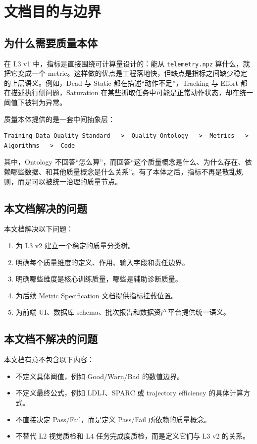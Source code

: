 \documentclass[UTF8,zihao=-4,oneside,openany]{ctexrep}
\newcommand{\Code}[1]{\texttt{#1}}
\begin{document}
\section{文档目的与边界}

\subsection{为什么需要质量本体}

在 L3 v1 中，指标是直接围绕可计算量设计的：能从 \Code{telemetry.npz} 算什么，就把它变成一个 metric。这样做的优点是工程落地快，但缺点是指标之间缺少稳定的上层语义。例如，Dead 与 Static 都在描述“动作不足”，Tracking 与 Effort 都在描述执行侧问题，Saturation 在某些抓取任务中可能是正常动作状态，却在统一阈值下被判为异常。

质量本体提供的是一套中间抽象层：
\begin{verbatim}
Training Data Quality Standard  ->  Quality Ontology  ->  Metrics  ->  Algorithms  ->  Code
\end{verbatim}

其中，Ontology 不回答“怎么算”，而回答“这个质量概念是什么、为什么存在、依赖哪些数据、和其他质量概念是什么关系”。有了本体之后，指标不再是散乱规则，而是可以被统一治理的质量节点。

\subsection{本文档解决的问题}

本文档解决以下问题：
\begin{enumerate}
  \item 为 L3 v2 建立一个稳定的质量分类树。
  \item 明确每个质量维度的定义、作用、输入字段和责任边界。
  \item 明确哪些维度是核心训练质量，哪些是辅助诊断质量。
  \item 为后续 Metric Specification 文档提供指标挂载位置。
  \item 为前端 UI、数据库 schema、批次报告和数据资产平台提供统一语义。
\end{enumerate}

\subsection{本文档不解决的问题}

本文档有意不包含以下内容：
\begin{itemize}
  \item 不定义具体阈值，例如 Good/Warn/Bad 的数值边界。
  \item 不定义最终公式，例如 LDLJ、SPARC 或 trajectory efficiency 的具体计算方式。
  \item 不直接决定 Pass/Fail，而是定义 Pass/Fail 所依赖的质量概念。
  \item 不替代 L2 视觉质检和 L4 任务完成度质检，而是定义它们与 L3 v2 的关系。
\end{itemize}
\end{document}
